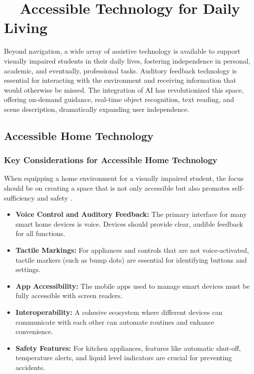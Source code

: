 \section{~~Accessible Technology for Daily Living}\label{ch8:sec:accessible-tech-daily-living}

Beyond navigation, a wide array of assistive technology is available to support visually impaired students in their daily lives, fostering independence in personal, academic, and eventually, professional tasks. Auditory feedback technology is essential for interacting with the environment and receiving information that would otherwise be missed. The integration of AI has revolutionized this space, offering on-demand guidance, real-time object recognition, text reading, and scene description, dramatically expanding user independence.\supercite{aimodels2024, msseeingai, envision}

\subsection{Accessible Home Technology}

\subsubsection{Key Considerations for Accessible Home Technology}
When equipping a home environment for a visually impaired student, the focus should be on creating a space that is not only accessible but also promotes self-sufficiency and safety \supercite{AllAboutVision2023}.

\begin{itemize}
	\item \textbf{Voice Control and Auditory Feedback:} The primary interface for many smart home devices is voice. Devices should provide clear, audible feedback for all functions.
	\item \textbf{Tactile Markings:} For appliances and controls that are not voice-activated, tactile markers (such as bump dots) are essential for identifying buttons and settings.
	\item \textbf{App Accessibility:} The mobile apps used to manage smart devices must be fully accessible with screen readers.
	\item \textbf{Interoperability:} A cohesive ecosystem where different devices can communicate with each other can automate routines and enhance convenience.
	\item \textbf{Safety Features:} For kitchen appliances, features like automatic shut-off, temperature alerts, and liquid level indicators are crucial for preventing accidents.
\end{itemize}

